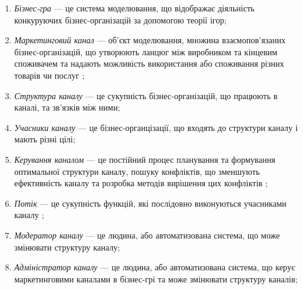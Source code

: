 \begin{enumerate}
\item {\it Бізнес-гра} --- це система моделювання, що відображає діяльність конкуруючих бізнес-організацій за допомогою теорії ігор;
\item {\it Маркетинговий канал} --- об’єкт моделювання, множина взаємопов’язаних бізнес-організацій, що утворюють ланцюг між виробником та кінцевим споживачем та надають можливість використання або споживання різних товарів чи послуг \cite{stern};
\item {\it Структура каналу} --- це сукупність бізнес-організацій, що працюють в каналі, та зв’язків між ними;
\item {\it Учасники каналу} --- це бізнес-органцізації, що входять до структури каналу і мають різні цілі;
\item {\it Керування каналом} --- це постійний процес планування та формування оптимальної структури каналу, пошуку конфліктів, що зменшують ефективність каналу та розробка методів вирішення цих конфліктів \cite{stern};
\item {\it Потік} --- це сукупність функцій, які послідовно виконуються учасниками каналу \cite{stern};
\item {\it Модератор каналу} --- це людина, або автоматизована система, що може змінювати структуру каналу;
\item {\it Адміністратор каналу} --- це людина, або автоматизована система, що керує маркетинговими каналами в бізнес-грі та може змінювати структуру каналів;
\end{enumerate}

